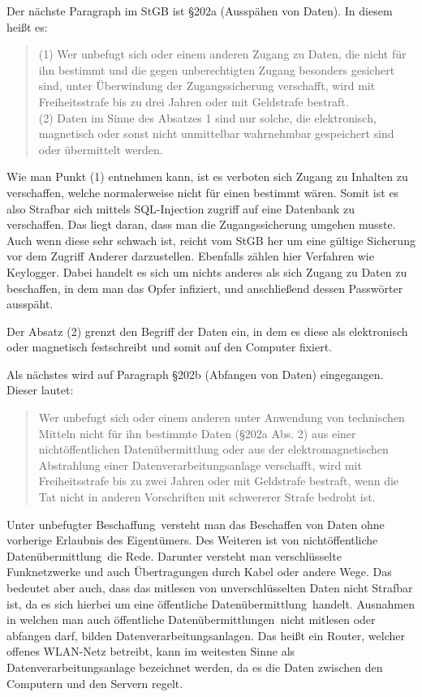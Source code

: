 \documentclass[10pt,a4paper]{article}
\begin{document}
Der nächste Paragraph im StGB ist §202a (Ausspähen von Daten). In diesem heißt es:
\begin{quote}
(1) Wer unbefugt sich oder einem anderen Zugang zu Daten, die nicht für ihn bestimmt und die gegen unberechtigten Zugang besonders gesichert sind, unter Überwindung der Zugangssicherung verschafft, wird mit Freiheitsstrafe bis zu drei Jahren oder mit Geldstrafe bestraft.\\
(2) Daten im Sinne des Absatzes 1 sind nur solche, die elektronisch, magnetisch oder sonst nicht unmittelbar wahrnehmbar gespeichert sind oder übermittelt werden.
\end{quote}

Wie man Punkt (1) entnehmen kann, ist es verboten sich Zugang zu Inhalten zu verschaffen, welche normalerweise nicht für einen bestimmt wären. Somit ist es also Strafbar sich mittels SQL-Injection zugriff auf eine Datenbank zu verschaffen. Das liegt daran, dass man die Zugangssicherung umgehen musste. Auch wenn diese sehr schwach ist, reicht vom StGB her um eine gültige Sicherung vor dem Zugriff Anderer darzustellen. Ebenfalls zählen hier Verfahren wie Keylogger. Dabei handelt es sich um nichts anderes als sich Zugang zu Daten zu beschaffen, in dem man das Opfer infiziert, und anschließend dessen Passwörter ausspäht. 

Der Absatz (2) grenzt den Begriff der Daten ein, in dem es diese als elektronisch oder magnetisch festschreibt und somit auf den Computer fixiert. 

Als nächstes wird auf Paragraph §202b (Abfangen von Daten) eingegangen. Dieser lautet:
\begin{quote}
Wer unbefugt sich oder einem anderen unter Anwendung von technischen Mitteln nicht für ihn bestimmte Daten (§202a Abs. 2) aus einer nichtöffentlichen Datenübermittlung oder aus der elektromagnetischen Abstrahlung einer Datenverarbeitungsanlage verschafft, wird mit Freiheitsstrafe bis zu zwei Jahren oder mit Geldstrafe bestraft, wenn die Tat nicht in anderen Vorschriften mit schwererer Strafe bedroht ist.
\end{quote}
Unter \glqq unbefugter Beschaffung\grqq \ versteht man das Beschaffen von Daten ohne vorherige Erlaubnis des Eigentümers. Des Weiteren ist von \glqq nichtöffentliche Datenübermittlung\grqq\ die Rede. Darunter versteht man verschlüsselte Funknetzwerke und auch Übertragungen durch Kabel oder andere Wege. Das bedeutet aber auch, dass das mitlesen von unverschlüsselten Daten nicht Strafbar ist, da es sich hierbei um eine \glqq öffentliche Datenübermittlung\grqq \ handelt. Ausnahmen in welchen man auch \glqq öffentliche Datenübermittlungen\grqq \  nicht mitlesen oder abfangen darf, bilden Datenverarbeitungsanlagen. Das heißt ein Router, welcher offenes WLAN-Netz betreibt, kann im weitesten Sinne als Datenverarbeitungsanlage bezeichnet werden, da es die Daten zwischen den Computern und den Servern regelt.
\end{document}
